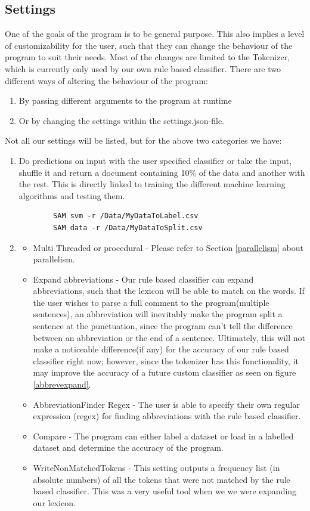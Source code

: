 \subsection{Settings} \label{settings}

One of the goals of the program is to be general purpose. This also implies a level of customizability for the user, such that they can change the behaviour of the program to suit their needs. Most of the changes are limited to the Tokenizer, which is currently only used by our own rule based classifier. There are two different ways of altering the behaviour of the program: 
\begin{enumerate}
	\item By passing different arguments to the program at runtime
	\item Or by changing the settings within the settings.json-file.
\end{enumerate}
Not all our settings will be listed, but for the above two categories we have:

\begin{enumerate}
	\item Do predictions on input with the user specified classifier or take the input, shuffle it and return a document containing 10\% of the data and another with the rest. This is directly linked to training the different machine learning algorithms and testing them. 
	\begin{verbatim}
		SAM svm -r /Data/MyDataToLabel.csv
		SAM data -r /Data/MyDataToSplit.csv
	\end{verbatim} 
	\item \begin{itemize}
		\item Multi Threaded or procedural - Please refer to Section \ref{parallelism} about parallelism.
		\item Expand abbreviations - Our rule based classifier can expand abbreviations, such that the lexicon will be able to match on the words. If the user wishes to parse a full comment to the program(multiple sentences), an abbreviation will inevitably make the program split a sentence at the punctuation, since the program can’t tell the difference between an abbreviation or the end of a sentence. Ultimately, this will not make a noticeable difference(if any) for the accuracy of our rule based classifier right now; however, since the tokenizer has this functionality, it may improve the accuracy of a future custom classifier as seen on figure \ref{abbrevexpand}.
		\item AbbreviationFinder Regex - The user is able to specify their own regular expression (regex) for finding abbreviations with the rule based classifier.
		\item Compare - The program can either label a dataset or load in a labelled dataset and determine the accuracy of the program.
		\item WriteNonMatchedTokens - This setting outputs a frequency list (in absolute numbers) of all the tokens that were not matched by the rule based classifier. This was a very useful tool when we we were expanding our lexicon.
	\end{itemize}
\end{enumerate}

